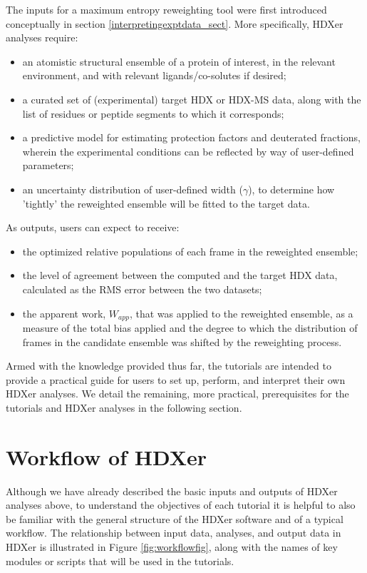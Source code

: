 \documentclass[9pt,tutorial]{livecoms}
\begin{document}
The inputs for a maximum entropy reweighting tool were first introduced conceptually in section \ref{interpretingexptdata_sect}. More specifically, HDXer analyses require:
\begin{itemize}
    \item an atomistic structural ensemble of a protein of interest, in the relevant environment, and with relevant ligands/co-solutes if desired;
    \item a curated set of (experimental) target HDX or HDX-MS data, along with the list of residues or peptide segments to which it corresponds;
    \item a predictive model for estimating protection factors and deuterated fractions, wherein the experimental conditions can be reflected by way of user-defined parameters;
    \item an uncertainty distribution of user-defined width ($\gamma$), to determine how 'tightly' the reweighted ensemble will be fitted to the target data.
\end{itemize}
As outputs, users can expect to receive:
\begin{itemize}
    \item the optimized relative populations of each frame in the reweighted ensemble;
    \item the level of agreement between the computed and the target HDX data, calculated as the RMS error between the two datasets;
    \item the apparent work, $W_{app}$, that was applied to the reweighted ensemble, as a measure of the total bias applied and the degree to which the distribution of frames in the candidate ensemble was shifted by the reweighting process.
\end{itemize}
Armed with the knowledge provided thus far, the tutorials are intended to provide a practical guide for users to set up, perform, and interpret their own HDXer analyses.
We detail the remaining, more practical, prerequisites for the tutorials and HDXer analyses in the following section.

\section{Workflow of HDXer}
Although we have already described the basic inputs and outputs of HDXer analyses above, to understand the objectives of each tutorial it is helpful to also be familiar with the general structure of the HDXer software and of a typical workflow.
The relationship between input data, analyses, and output data in HDXer is illustrated in Figure \ref{fig:workflowfig}, along with the names of key modules or scripts that will be used in the tutorials.
\end{document}
